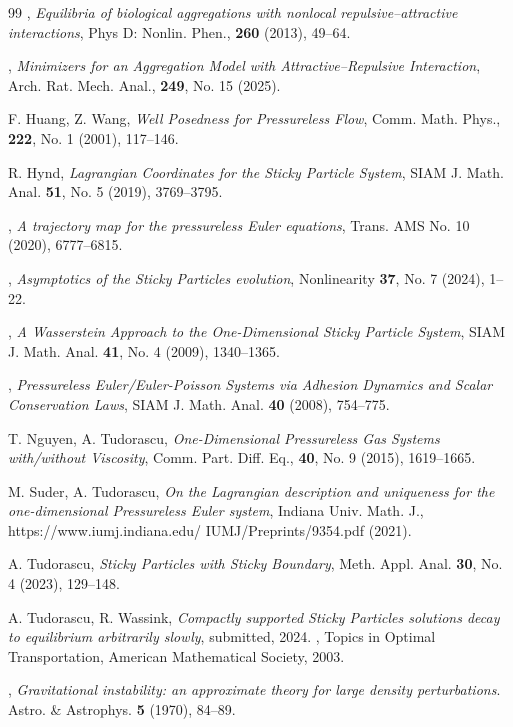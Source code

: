\documentclass[11pt]{article}
\numberwithin{equation}{section}
\begin{document}
\begin{thebibliography}{99}
,
{\em Equilibria of biological aggregations with nonlocal repulsive–attractive interactions},
Phys D: Nonlin. Phen.,
\textbf{260}
(2013), 49--64.

, {\em Minimizers for an Aggregation Model with Attractive–Repulsive Interaction}, Arch. Rat. Mech. Anal., \textbf{249}, No. 15 (2025).

 {\sc F. Huang, Z. Wang},
{\em Well Posedness for Pressureless Flow},
Comm. Math. Phys., \textbf{222}, No. 1 (2001), 117--146.

 {\sc R. Hynd},
\emph{Lagrangian Coordinates for the Sticky Particle System}, SIAM J. Math. Anal. \textbf{51}, No. 5 (2019), 3769--3795.


, \emph{A trajectory map for the pressureless Euler equations}, Trans. AMS No. 10 (2020), 6777--6815. 

, \emph{Asymptotics of the Sticky Particles evolution}, 
Nonlinearity \textbf{37}, No. 7 (2024), 1--22.

, \emph{A Wasserstein Approach to the One-Dimensional Sticky Particle System}, SIAM J. Math. Anal.
   \textbf{41}, No. 4 (2009), 1340--1365.
   

, \emph{Pressureless Euler/Euler-Poisson Systems via Adhesion Dynamics and Scalar Conservation Laws}, SIAM J. Math. Anal. \textbf{40} (2008), 754--775.

{\sc T. Nguyen, A. Tudorascu},
{\em One-Dimensional Pressureless Gas Systems with/without Viscosity},
Comm. Part. Diff. Eq., \textbf{40}, No. 9 (2015), 1619--1665.

{\sc M. Suder, A. Tudorascu},
{\em On the Lagrangian description and uniqueness for the one-dimensional Pressureless Euler system},
Indiana Univ. Math. J., https://www.iumj.indiana.edu/ IUMJ/Preprints/9354.pdf (2021).



{\sc A. Tudorascu},
{\em Sticky Particles with Sticky Boundary}, Meth. Appl. Anal. \textbf{30}, No. 4 (2023), 129--148.

  {\sc A. Tudorascu, R. Wassink}, {\em Compactly supported Sticky Particles solutions decay to equilibrium arbitrarily slowly}, submitted, 2024.
, Topics in Optimal Transportation,  American Mathematical Society, 2003.

, \emph{Gravitational instability: an approximate theory for large density perturbations}. Astro. \& Astrophys. \textbf{5} (1970), 84--89.
\end{thebibliography}
\end{document}
